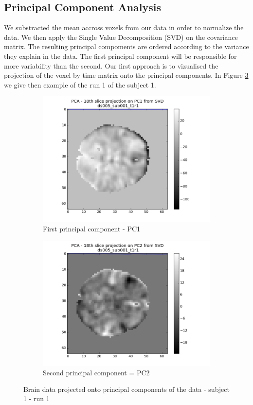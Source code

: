 \subsection{Principal Component Analysis}
\noindent
\par We substracted the mean accross voxels from our data in order to normalize the data.
We then apply the Single Value Decomposition (SVD) on the covariance matrix. The resulting
principal compoments are ordered according to the variance they explain in the data. 
The first principal component will be responsible for more variability than the second.
Our first approach is to vizualised the projection of the voxel by time matrix onto 
the principal components. In Figure \ref{fig:pcaa} we give then example of the run 1 
of the subject 1. 

\begin{figure}[H]
\begin{subfigure}{.5\textwidth}
    \centering
    \includegraphics[width=.9\linewidth]{../fig/pca/ds005_sub001_t1r1_PC1.png}
    \caption{First principal component - PC1}
    \label{fig:pca1}
\end{subfigure}%
\begin{subfigure}{.5\textwidth}
    \centering
    \includegraphics[width=.9\linewidth]{../fig/pca/ds005_sub001_t1r1_PC2.png}
    \caption{Second principal component = PC2}
    \label{fig:pca2}
\end{subfigure}
\caption{Brain data projected onto principal components of the data  - subject 1 - run 1}
\label{fig:pcaa}
\end{figure}

